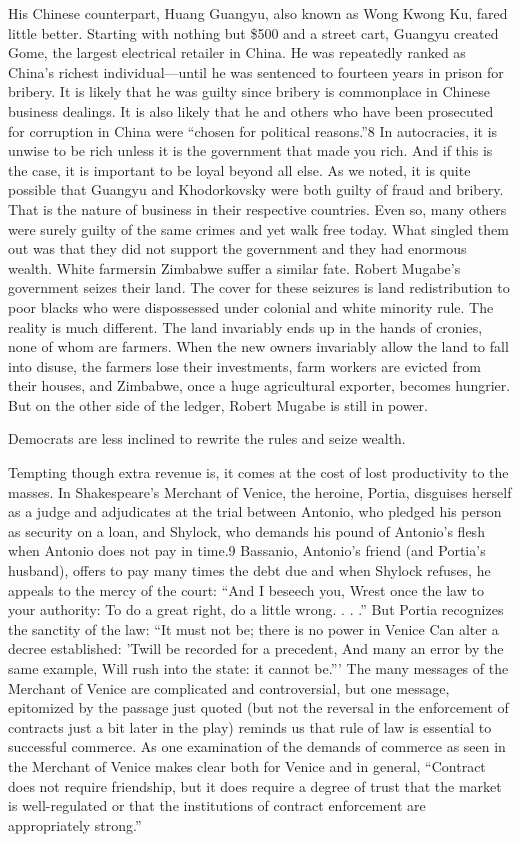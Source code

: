 \documentclass[10pt]{article}
\begin{document}
{\large His Chinese counterpart, Huang Guangyu, also known as Wong Kwong Ku,
fared little better. Starting with nothing but \$500 and a street cart, Guangyu
created Gome, the largest electrical retailer in China. He was repeatedly ranked
as China's richest individual---until he was sentenced to fourteen years in
prison for bribery. It is likely that he was guilty since bribery is commonplace
in Chinese business dealings. It is also likely that he and others who have been
prosecuted for corruption in China were ``chosen for political reasons.''8 In
autocracies, it is unwise to be rich unless it is the government that made you
rich. And if this is the case, it is important to be loyal beyond all else. As we
noted, it is quite possible that Guangyu and Khodorkovsky were both guilty of
fraud and bribery. That is the nature of business in their respective countries.
Even so, many others were surely guilty of the same crimes and yet walk free
today. What singled them out was that they did not support the government and
they had enormous wealth. White farmersin Zimbabwe suffer a similar fate. Robert
Mugabe's government seizes their land. The cover for these seizures is land
redistribution to poor blacks who were dispossessed under colonial and white
minority rule. The reality is much different. The land invariably ends up in the
hands of cronies, none of whom are farmers. When the new owners invariably allow
the land to fall into disuse, the farmers lose their investments, farm workers
are evicted from their houses, and Zimbabwe, once a huge agricultural exporter,
becomes hungrier. But on the other side of the ledger, Robert Mugabe is still in
power.}

{\large Democrats are less inclined to rewrite the rules and seize wealth.}

{\large Tempting though extra revenue is, it comes at the cost of lost
productivity to the masses. In Shakespeare's Merchant of Venice, the heroine,
Portia, disguises herself as a judge and adjudicates at the trial between
Antonio, who pledged his person as security on a loan, and Shylock, who demands
his pound of Antonio's flesh when Antonio does not pay in time.9 Bassanio,
Antonio's friend (and Portia's husband), offers to pay many times the debt due
and when Shylock refuses, he appeals to the mercy of the court: ``And I beseech
you, Wrest once the law to your authority: To do a great right, do a little
wrong. . . .'' But Portia recognizes the sanctity of the law: ``It must not be;
there is no power in Venice Can alter a decree established: 'Twill be recorded
for a precedent, And many an error by the same example, Will rush into the state:
it cannot be.''' The many messages of the Merchant of Venice are complicated and
controversial, but one message, epitomized by the passage just quoted (but not
the reversal in the enforcement of contracts just a bit later in the play)
reminds us that rule of law is essential to successful commerce. As one
examination of the demands of commerce as seen in the Merchant of Venice makes
clear both for Venice and in general, ``Contract does not require friendship, but
it does require a degree of trust that the market is well-regulated or that the
institutions of contract enforcement are appropriately strong.''}
\end{document}
